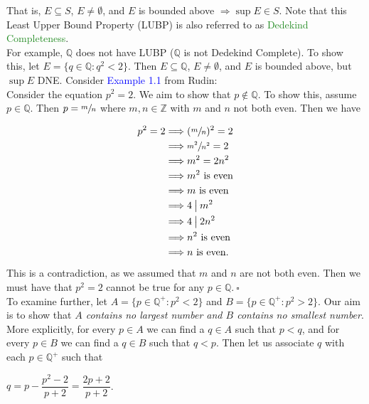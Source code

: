 \documentclass{article}
\newcommand{\Divides}{\mathbin{\big|}}
\begin{document}
That is, $E \subseteq S$, $E \neq \emptyset$, and $E$ is bounded above $\Longrightarrow \sup{E} \in S$. Note that this Least Upper Bound Property (LUBP) is also referred to as \textcolor{ForestGreen}{Dedekind Completeness}.\\

For example, $\mathbb{Q}$ does not have LUBP ($\mathbb{Q}$ is not Dedekind Complete). To show this, let $E=\{q \in \mathbb{Q}: q^2 < 2\}$. Then $E \subseteq \mathbb{Q}$, $E \neq \emptyset$, and $E$ is bounded above, but $\sup{E}$ DNE. Consider \textcolor{blue}{Example 1.1} from Rudin:\\

Consider the equation $p^2=2$. We aim to show that $p \notin \mathbb{Q}$. To show this, assume $p \in \mathbb{Q}$. Then $p=\sfrac{m}{n}$ where $m,n \in \mathbb{Z}$ with $m$ and $n$ not both even. Then we have 

\begin{align*}
    p^2=2 &\Longrightarrow (\sfrac{m}{n})^2=2\\
    &\Longrightarrow \sfrac{m^2}{n^2}=2\\
    &\Longrightarrow m^2 = 2n^2 \\
    &\Longrightarrow m^2 \ \text{is even}\\
    &\Longrightarrow m \ \text{is even}\\
    &\Longrightarrow 4 \Divides m^2 \\
    &\Longrightarrow 4 \Divides 2n^2\\
    &\Longrightarrow n^2 \ \text{is even}\\
    &\Longrightarrow n \ \text{is even}.
\end{align*}

This is a contradiction, as we assumed that $m$ and $n$ are not both even. Then we must have that $p^2=2$ cannot be true for any $p \in \mathbb{Q}. \ \square$ \\

To examine further, let $A=\{p \in \mathbb{Q}^+:p^2 < 2\}$ and $B=\{p \in \mathbb{Q}^+:p^2 > 2\}$. Our aim is to show that \textit{$A$ contains no largest number and $B$ contains no smallest number}. More explicitly, for every $p \in A$ we can find a $q \in A$ such that $p < q$, and for every $p \in B$ we can find a $q \in B$ such that $q < p$. Then let us associate $q$ with each $p \in \mathbb{Q}^+$ such that 

\begin{center}
    $q = p - \dfrac{p^2-2}{p+2} = \dfrac{2p+2}{p+2}$.
\end{center}
\end{document}
